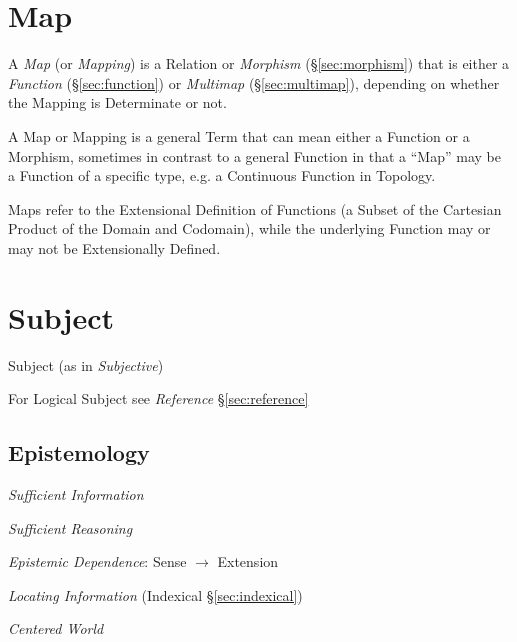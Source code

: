 \section{Map}\label{sec:map}

A \emph{Map} (or \emph{Mapping}) is a Relation or \emph{Morphism}
(\S\ref{sec:morphism}) that is either a \emph{Function}
(\S\ref{sec:function}) or \emph{Multimap} (\S\ref{sec:multimap}),
depending on whether the Mapping is Determinate or not.

A Map or Mapping is a general Term that can mean either a Function or
a Morphism, sometimes in contrast to a general Function in that a
``Map'' may be a Function of a specific type, e.g. a Continuous
Function in Topology.

Maps refer to the Extensional Definition of Functions (a Subset of the
Cartesian Product of the Domain and Codomain), while the underlying
Function may or may not be Extensionally Defined.



\section{Subject}\label{sec:subject}

Subject (as in \emph{Subjective})

For Logical Subject see \emph{Reference} \S\ref{sec:reference}



\subsection{Epistemology}\label{sec:epistemology}
\cite{chalmers02}

\emph{Sufficient Information}

\emph{Sufficient Reasoning}

\emph{Epistemic Dependence}: Sense $\rightarrow$ Extension

\emph{Locating Information} (Indexical \S\ref{sec:indexical})

\emph{Centered World}



